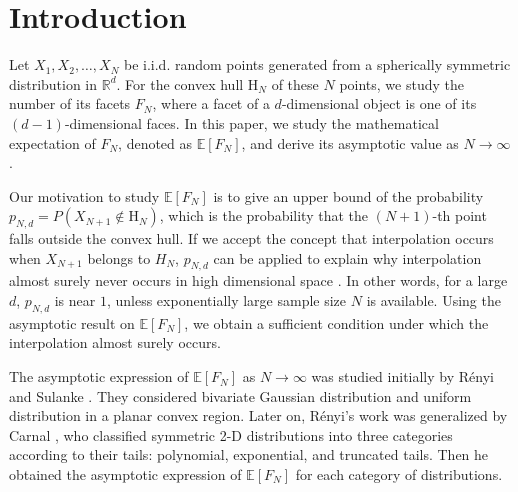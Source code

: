 \documentclass{aptpub}
\def\E{\mathbb{E}}
\begin{document}
\section{Introduction}\label{sec:intro} %


Let $X_1, X_2, \dots, X_N$ be i.i.d. random points generated from
a spherically symmetric distribution in $\mathbb{R}^d$.
For the convex hull $\mathrm{H}_N$ of these $N$ points, we study the number of its facets $F_N$,
where a facet of a $d$-dimensional object is one of its $(d-1)$-dimensional faces.
In this paper, we study the mathematical expectation
of $F_N$, denoted as $\E[F_N]$, and derive its asymptotic value as $N\to \infty$.

Our motivation to study $\E[F_N]$ is to give an upper bound of
the probability $p_{N,d}=P(X_{N+1} \not\in \mathrm{H}_N)$,
which is the probability that the $(N+1)$-th point falls outside the convex hull.
If we accept the concept that interpolation occurs when $X_{N+1}$ belongs to $H_N$,
$p_{N,d}$ can be applied to explain
why interpolation almost surely never occurs in high dimensional space \cite{balestriero2021learning}.
In other words, for a large $d$, $p_{N,d}$ is near $1$, unless exponentially large sample size $N$ is available.
Using the asymptotic result on $\E[F_N]$, we obtain
a sufficient condition under which the interpolation almost surely occurs.


The asymptotic expression of $\E[F_N]$ as $N\to \infty$
was studied initially by R{\'e}nyi and Sulanke \cite{renyi1963konvexe}.
They considered
bivariate Gaussian distribution and uniform distribution
in a planar convex region.
Later on,  R{\'e}nyi's work was generalized by
Carnal \cite{carnal1970konvexe}, who
classified symmetric 2-D distributions
into three categories according to their tails:
polynomial, exponential, and truncated tails.
Then he obtained the asymptotic expression of $\E[F_N]$
for each category of distributions.
\end{document}
